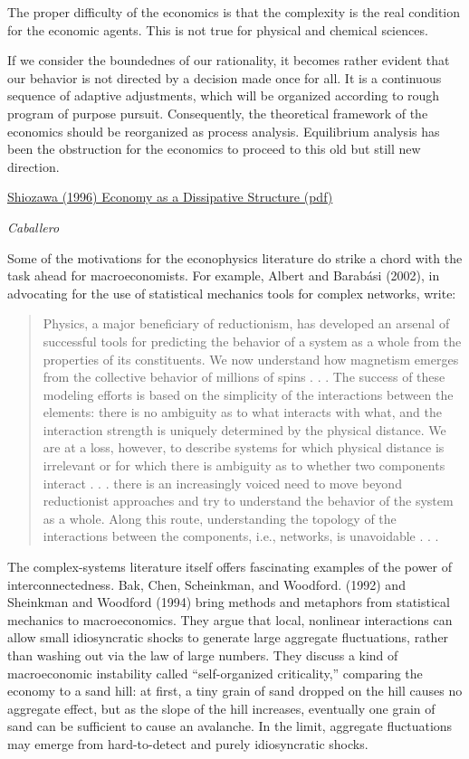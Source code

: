 \documentclass[
]{book}
\begin{document}
The proper difficulty of the economics is that the complexity is the real
condition for the economic agents. This is not true for physical and chemical
sciences.

If we consider the boundednes of our rationality, it becomes rather evident
that our behavior is not directed by a decision made once for all. It is a
continuous sequence of adaptive adjustments, which will be organized
according to rough program of purpose pursuit.
Consequently, the
theoretical framework of the economics should be reorganized as process
analysis. Equilibrium analysis has been the obstruction for the economics to
proceed to this old but still new direction.

\href{pdf/Shiozawa_1996_Economy_as_a_Dissipative_Structure.pdf}{Shiozawa (1996) Economy as a Dissipative Structure (pdf)}

\emph{Caballero}

Some of the motivations for the econophysics literature do strike a chord
with the task ahead for macroeconomists. For example, Albert and Barabási (2002), in
advocating for the use of statistical mechanics tools for complex networks, write:

\begin{quote}
Physics, a major beneficiary of reductionism, has developed an arsenal of successful tools
for predicting the behavior of a system as a whole from the properties of its constituents. We
now understand how magnetism emerges from the collective behavior of millions of spins . .
. The success of these modeling efforts is based on the simplicity of the interactions between
the elements: there is no ambiguity as to what interacts with what, and the interaction
strength is uniquely determined by the physical distance. We are at a loss, however, to
describe systems for which physical distance is irrelevant or for which there is ambiguity as
to whether two components interact . . . there is an increasingly voiced need to move beyond
reductionist approaches and try to understand the behavior of the system as a whole. Along
this route, understanding the topology of the interactions between the components, i.e.,
networks, is unavoidable . . .
\end{quote}

The complex-systems literature itself offers fascinating examples of the power
of interconnectedness. Bak, Chen, Scheinkman, and Woodford. (1992) and Sheinkman and
Woodford (1994) bring methods and metaphors from statistical mechanics to macroeconomics.
They argue that local, nonlinear interactions can allow small idiosyncratic shocks to generate
large aggregate fluctuations, rather than washing out via the law of large numbers. They discuss
a kind of macroeconomic instability called ``self-organized criticality,'' comparing the economy
to a sand hill: at first, a tiny grain of sand dropped on the hill causes no aggregate effect, but as
the slope of the hill increases, eventually one grain of sand can be sufficient to cause an
avalanche. In the limit, aggregate fluctuations may emerge from hard-to-detect and purely
idiosyncratic shocks.
\end{document}
